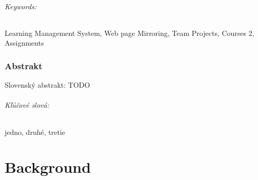 \documentclass[12pt, oneside]{book}
\newcommand{\assignment}[2][]{\todo[inline,bordercolor=green!67!yellow!75!black!50,color=green!67!yellow!25,size=\footnotesize,#1]{#2}}
\begin{document}


\paragraph*{Keywords:} Learning Management System, Web page Mirroring, Team Projects, Courses 2, Assignments


\newpage 
\section*{Abstrakt}


Slovenský abstrakt: TODO

\paragraph*{Kľúčové slová:} jedno, druhé, tretie

%
%



\newpage 

\tableofcontents
\lstlistoflistings
\listoffigures



\newpage 



\mainmatter


 

\part{Background}

%


\end{document}
